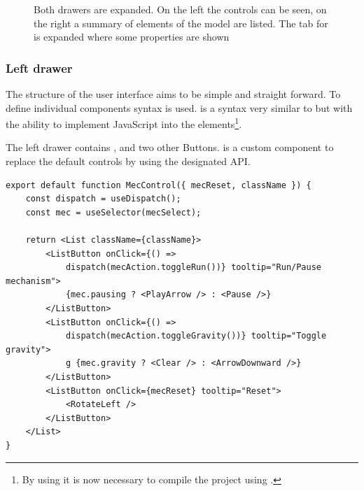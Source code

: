 \begin{figure}
    \centering
    \caption[Screenshot of the web application]{ Both drawers are expanded. On the left the  controls can be seen, on the right a summary of elements of the model are listed. The tab for  is expanded where some properties are shown }
    \label{fig:deepmech_klawr_de}
\end{figure}

\subsubsection{Left drawer}

The structure of the user interface aims to be simple and straight forward.
To define individual components   syntax is used.
 is a syntax very similar to  but with the ability to implement JavaScript into the elements\footnote{By using  it is now necessary to compile the project using .}. %

The left drawer contains ,  and two other Buttons.
 is a custom  component to replace the default  controls by using the designated API.

\begin{lstlisting}[label={lst:mec_control}, caption={Definition of the \name{MecControl component.}}]
export default function MecControl({ mecReset, className }) {
    const dispatch = useDispatch();
    const mec = useSelector(mecSelect);

    return <List className={className}>
        <ListButton onClick={() =>
            dispatch(mecAction.toggleRun())} tooltip="Run/Pause mechanism">
            {mec.pausing ? <PlayArrow /> : <Pause />}
        </ListButton>
        <ListButton onClick={() =>
            dispatch(mecAction.toggleGravity())} tooltip="Toggle gravity">
            g {mec.gravity ? <Clear /> : <ArrowDownward />}
        </ListButton>
        <ListButton onClick={mecReset} tooltip="Reset">
            <RotateLeft />
        </ListButton>
    </List>
}
\end{lstlisting}

